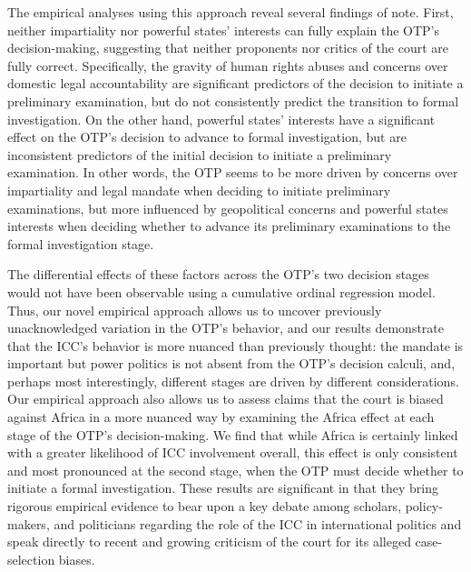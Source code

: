 The empirical analyses using this approach reveal several findings of note. First, neither impartiality nor powerful states' interests can fully explain the OTP's decision-making, suggesting that neither proponents nor critics of the court are fully correct. Specifically, the gravity of human rights abuses and concerns over domestic legal accountability are significant predictors of the decision to initiate a preliminary examination, but do not consistently predict the transition to formal investigation. On the other hand, powerful states' interests have a significant effect on the OTP's decision to advance to formal investigation, but are inconsistent predictors of the initial decision to initiate a preliminary examination. In other words, the OTP seems to be more driven by concerns over impartiality and legal mandate when deciding to initiate preliminary examinations, but more influenced by geopolitical concerns and powerful states interests when deciding whether to advance its preliminary examinations to the formal investigation stage.

The differential effects of these factors across the OTP's two decision stages would not have been observable using a cumulative ordinal regression model. Thus, our novel empirical approach allows us to uncover previously unacknowledged variation in the OTP's behavior, and our results demonstrate that the ICC's behavior is more nuanced than previously thought: the mandate is important but power politics is not absent from the OTP's decision calculi, and, perhaps most interestingly, different stages are driven by different considerations. Our empirical approach also allows us to assess claims that the court is biased against Africa in a more nuanced way by examining the Africa effect at each stage of the OTP's decision-making. We find that while Africa is certainly linked with a greater likelihood of ICC involvement overall, this effect is only consistent and most pronounced at the second stage, when the OTP must decide whether to initiate a formal investigation. These results are significant in that they bring rigorous empirical evidence to bear upon a key debate among scholars, policy-makers, and politicians regarding the role of the ICC in international politics and speak directly to recent and growing criticism of the court for its alleged case-selection biases.

